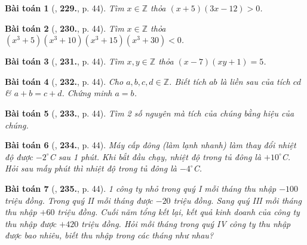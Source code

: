 \documentclass{article}
\numberwithin{equation}{section}
\newtheorem{baitoan}{Bài toán}
\begin{document}
\begin{baitoan}[\cite{Tuyen_Toan_6}, \textbf{229.}, p. 44]
	Tìm $x\in\mathbb{Z}$ thỏa $(x + 5)(3x - 12) > 0$.
\end{baitoan}

\begin{baitoan}[\cite{Tuyen_Toan_6}, \textbf{230.}, p. 44]
	Tìm $x\in\mathbb{Z}$ thỏa $(x^3 + 5)(x^3 + 10)(x^3 + 15)(x^3 + 30) < 0$.
\end{baitoan}

\begin{baitoan}[\cite{Tuyen_Toan_6}, \textbf{231.}, p. 44]
	Tìm $x,y\in\mathbb{Z}$ thỏa $(x - 7)(xy + 1) = 5$.
\end{baitoan}

\begin{baitoan}[\cite{Tuyen_Toan_6}, \textbf{232.}, p. 44]
	Cho $a,b,c,d\in\mathbb{Z}$. Biết tích $ab$ là liền sau của tích $cd$ \& $a + b = c + d$. Chứng minh $a = b$.
\end{baitoan}

\begin{baitoan}[\cite{Tuyen_Toan_6}, \textbf{233.}, p. 44]
	Tìm 2 số nguyên mà tích của chúng bằng hiệu của chúng.
\end{baitoan}

\begin{baitoan}[\cite{Tuyen_Toan_6}, \textbf{234.}, p. 44]
	Máy cấp đông (làm lạnh nhanh) làm thay đổi nhiệt độ được $-2^\circ$C sau 1 phút. Khi bắt đầu chạy, nhiệt độ trong tủ đông là $+10^\circ$C. Hỏi sau mấy phút thì nhiệt độ trong tủ đông là $-4^\circ$C.
\end{baitoan}

\begin{baitoan}[\cite{Tuyen_Toan_6}, \textbf{235.}, p. 44]
	1 công ty nhỏ trong quý I mỗi tháng thu nhập $-100$ triệu đồng. Trong quý II mỗi tháng được $-20$ triệu đồng. Sang quý III mỗi tháng thu nhập $+60$ triệu đồng. Cuối năm tổng kết lại, kết quả kinh doanh của công ty thu nhập được $+420$ triệu đồng. Hỏi mỗi tháng trong quý IV công ty thu nhập được bao nhiêu, biết thu nhập trong các tháng như nhau?
\end{baitoan}


\printbibliography[heading=bibintoc]
	
\end{document}
